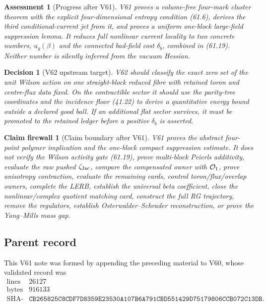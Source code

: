 \documentclass[11pt,oneside]{book}
\newtheorem{assessment}[theorem]{Assessment}
\newtheorem{firewall}[theorem]{Claim firewall}
\newtheorem{decision}[theorem]{Decision}
\theoremstyle{definition}
\theoremstyle{remark}
\begin{document}
\begin{assessment}[Progress after V61]
\label{ass:e8v61-status}
V61 proves a volume-free four-mark cluster theorem with the explicit
four-dimensional entropy condition (61.6), derives the third
conditional-current jet from it, and proves a uniform one-block
large-field suppression lemma.  It reduces full nonlinear current
locality to two concrete numbers, \(u_g(\beta)\) and the connected
bad-field cost \(\delta_b\), combined in (61.19).  Neither number is
silently inferred from the vacuum Hessian.
\end{assessment}

\begin{decision}[V62 upstream target]
\label{dec:e8v61-next}
V62 should classify the exact zero set of the unit Wilson action on
one straight-block reduced fibre with retained toron and centre-flux
data fixed.  On the contractible sector it should use the parity-tree
coordinates and the incidence floor (41.22) to derive a quantitative
energy bound outside a declared good ball.  If an additional flat
sector survives, it must be promoted to the retained ledger before a
positive \(\delta_b\) is asserted.
\end{decision}

\begin{firewall}[Claim boundary after V61]
\label{fire:e8v61-claim}
V61 proves the abstract four-point polymer implication and the
one-block compact suppression estimate.  It does not verify the
Wilson activity gate (61.19), prove multi-block Peierls additivity,
evaluate the raw pushed \(\zeta_{\rm Jac}\), compare the compensated
owner with \({\cal O}_1\), prove anisotropy contraction, evaluate the
remaining cards, control toron/flux/overlap owners, complete the LERB,
establish the universal beta coefficient, close the nonlinear/complex
quotient matching card, construct the full RG trajectory, remove the
regulators, establish Osterwalder--Schrader reconstruction, or prove
the Yang--Mills mass gap.
\end{firewall}

\subsection{Parent record}

This V61 note was formed by appending the preceding material to V60,
whose validated record was
\[
\begin{array}{c|c}
\text{lines}&26127\\
\text{bytes}&916133\\
\text{SHA-256}&
\texttt{CB265825C8CDF7D8359E23530A107B6A791CBD551429D75179806CCB072C13DB}.
\end{array}
\]
\end{document}
